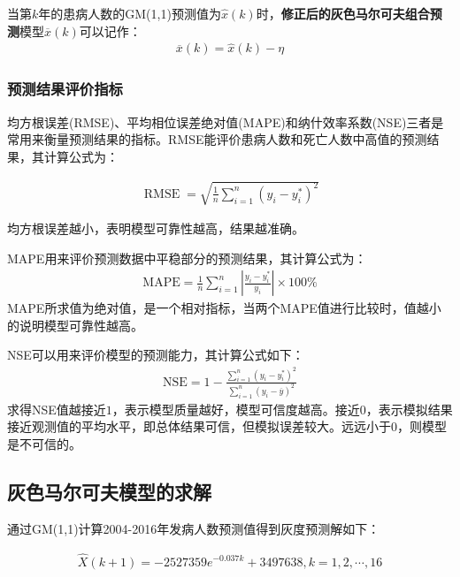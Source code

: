 \documentclass{whutmod}
\begin{document}
	  当第$k$年的患病人数的GM(1,1)预测值为$\widehat{x}(k)$时，\textbf{修正后的灰色马尔可夫组合预测}模型$\overline{x}(k)$可以记作：
	     \begin{gather}
	     \overline{x}(k) =\widehat{x}(k)-\eta
	   \end{gather}
	   \subsubsection{预测结果评价指标}
	   均方根误差(RMSE)、平均相位误差绝对值(MAPE)和纳什效率系数(NSE)三者是常用来衡量预测结果的指标。RMSE能评价患病人数和死亡人数中高值的预测结果，其计算公式为：

	    \begin{gather*}
	   \operatorname{RMSE}=\sqrt{\frac{1}{n} \sum_{i=1}^{n}\left(y_{i}-y_{i}^{*}\right)^{2}}
	   \end{gather*}
	   

	   均方根误差越小，表明模型可靠性越高，结果越准确。
	    
	     MAPE用来评价预测数据中平稳部分的预测结果，其计算公式为：
	    \begin{gather*}
\mathrm{MAPE}=\frac{1}{n} \sum_{i=1}^{n}\left|\frac{y_{i}-y_{i}^{*}}{y_{i}}\right| \times 100 \%
	     \end{gather*}
	     MAPE所求值为绝对值，是一个相对指标，当两个MAPE值进行比较时，值越小的说明模型可靠性越高。
	     
	       NSE可以用来评价模型的预测能力，其计算公式如下：
	       	\begin{gather*}
\mathrm{NSE}=1-\frac{\sum_{i=1}^{n}\left(y_{i}-y_{i}^{*}\right)^{2}}{\sum_{i=1}^{n}\left(y_{i}-\overline{y}\right)^{2}}       
	       \end{gather*}
	       求得NSE值越接近$1$，表示模型质量越好，模型可信度越高。接近$0$，表示模拟结果接近观测值的平均水平，即总体结果可信，但模拟误差较大。远远小于$0$，则模型是不可信的。
	      
	 
	         
	\subsection{灰色马尔可夫模型的求解}   
	  通过GM(1,1)计算2004-2016年发病人数预测值得到灰度预测解如下：


	  	  \begin{gather}
	  \widehat{X}(k+1)=-2527359e^{-0.037k}+3497638,k=1,2,\cdots,16
	  \end{gather}
\end{document}
